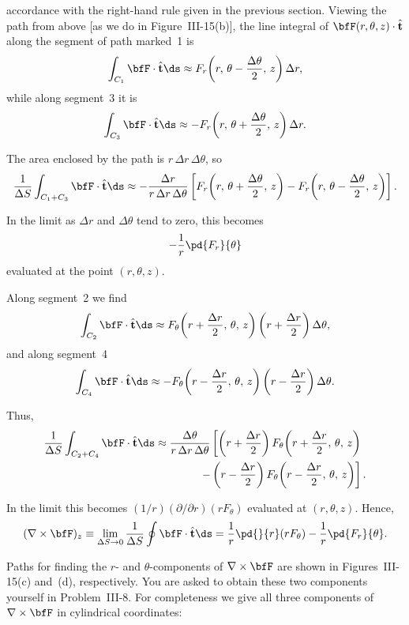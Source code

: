 \noindent accordance with the right-hand rule given in the previous
section.  Viewing the path from above [as we do in Figure~III-15(b)],
the line integral of
$\bfF(r,\theta,z)\cdot\hat{\mathbf{t}}$ along the segment of path
marked~1 is
\[
  \int_{C_1}\bfF\cdot\hat{\mathbf{t}}\ds
  \approx F_r\!\left(r,\,\theta-\frac{\Delta\theta}{2},\,z\right)
    \Delta r,
\]
while along segment~3 it is
\[
  \int_{C_3}\bfF\cdot\hat{\mathbf{t}}\ds
  \approx -F_r\!\left(r,\,\theta+\frac{\Delta\theta}{2},\,z\right)
    \Delta r.
\]

The area enclosed by the path is $r\,\Delta r\,\Delta\theta$, so
\[
  \frac{1}{\Delta S}\int_{C_1+C_3}\bfF\cdot\hat{\mathbf{t}}\ds
  \approx -\frac{\Delta r}{r\,\Delta r\,\Delta\theta}
    \left[F_r\!\left(r,\,\theta+\frac{\Delta\theta}{2},\,z\right)
    - F_r\!\left(r,\,\theta-\frac{\Delta\theta}{2},\,z\right)\right].
\]

In the limit as $\Delta r$ and $\Delta\theta$ tend to zero, this
becomes
\[
  -\frac{1}{r}\pd{F_r}{\theta}
\]
evaluated at the point $(r,\theta,z)$.

Along segment~2 we find
\[
  \int_{C_2}\bfF\cdot\hat{\mathbf{t}}\ds
  \approx F_\theta\!\left(r+\frac{\Delta r}{2},\,\theta,\,z\right)
    \left(r+\frac{\Delta r}{2}\right)\Delta\theta,
\]
and along segment~4
\[
  \int_{C_4}\bfF\cdot\hat{\mathbf{t}}\ds
  \approx -F_\theta\!\left(r-\frac{\Delta r}{2},\,\theta,\,z\right)
    \left(r-\frac{\Delta r}{2}\right)\Delta\theta.
\]

Thus,
\begin{align*}
  \frac{1}{\Delta S}\int_{C_2+C_4}\bfF\cdot\hat{\mathbf{t}}\ds
  &\approx \frac{\Delta\theta}{r\,\Delta r\,\Delta\theta}
    \left[\left(r+\frac{\Delta r}{2}\right)
    F_\theta\!\left(r+\frac{\Delta r}{2},\,\theta,\,z\right)\right.\\
  &\qquad\qquad \left.-\left(r-\frac{\Delta r}{2}\right)
    F_\theta\!\left(r-\frac{\Delta r}{2},\,\theta,\,z\right)\right].
\end{align*}

In the limit this becomes $(1/r)(\partial/\partial r)(rF_\theta)$
evaluated at $(r,\theta,z)$.  Hence,
\[
  (\nabla\times\bfF)_z
  \equiv \lim_{\Delta S\to 0}\frac{1}{\Delta S}
  \oint \bfF\cdot\hat{\mathbf{t}}\ds
  = \frac{1}{r}\pd{}{r}(rF_\theta) - \frac{1}{r}\pd{F_r}{\theta}.
\]

Paths for finding the $r$- and $\theta$-components of
$\nabla\times\bfF$ are shown in Figures~III-15(c) and~(d),
respectively.  You are asked to obtain these two components yourself in
Problem~III-8.  For completeness we give all three components of
$\nabla\times\bfF$ in cylindrical coordinates:

